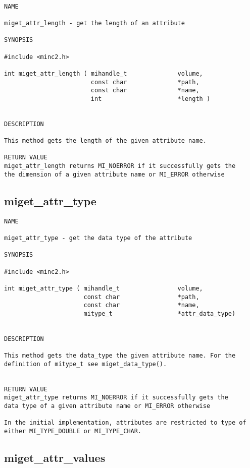 \documentclass{article}
\begin{document}
\begin{verbatim}

NAME 

miget_attr_length - get the length of an attribute

SYNOPSIS

#include <minc2.h>

int miget_attr_length ( mihandle_t              volume,
                        const char              *path,
                        const char              *name,
                        int                     *length ) 
               
                                
DESCRIPTION

This method gets the length of the given attribute name.

RETURN VALUE
miget_attr_length returns MI_NOERROR if it successfully gets the
the dimension of a given attribute name or MI_ERROR otherwise
\end{verbatim}

\subsection{miget\_attr\_type}

\begin{verbatim}
NAME 

miget_attr_type - get the data type of the attribute

SYNOPSIS

#include <minc2.h>

int miget_attr_type ( mihandle_t                volume,
                      const char                *path,
                      const char                *name,
                      mitype_t                  *attr_data_type) 
               
                                
DESCRIPTION

This method gets the data_type the given attribute name. For the
definition of mitype_t see miget_data_type().


RETURN VALUE
miget_attr_type returns MI_NOERROR if it successfully gets the
data type of a given attribute name or MI_ERROR otherwise

In the initial implementation, attributes are restricted to type of
either MI_TYPE_DOUBLE or MI_TYPE_CHAR.

\end{verbatim}

\subsection{miget\_attr\_values}
\end{document}
